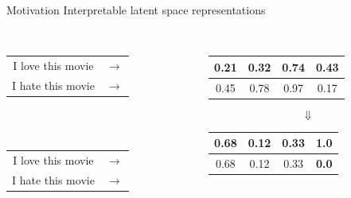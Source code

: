 \documentclass{beamer}
\begin{document}
\begin{frame}{Motivation}
  \centering
  {\LARGE Interpretable latent space representations} \\
  \vspace{1cm} \\
  \begin{columns}[T] %
    \begin{column}{.3\textwidth}
      \centering
      \begin{tabular}{ c c }
        I love this movie & $\rightarrow$ \\
        I hate this movie & $\rightarrow$ \\
      \end{tabular} \\
      \vspace{1.8cm} \\
      \begin{tabular}{ c c }
        I love this movie & $\rightarrow$ \\
        I hate this movie & $\rightarrow$ \\
      \end{tabular}
    \end{column}
    \hfill
    \begin{column}{.6\textwidth}
      \centering
      \begin{tabular}{ | c | c | c | c | }
        \hline
        0.21 & 0.32 & 0.74 & 0.43 \\
        \hline
        0.45 & 0.78 & 0.97 & 0.17 \\
        \hline
      \end{tabular}
      {\Huge$$\Downarrow$$}
      \begin{tabular}{ | c | c | c | c | }
        \hline
        0.68 & 0.12 & 0.33 & {\color{red}\textbf{1.0}} \\
        \hline
        \hline
        0.68 & 0.12 & 0.33 & {\color{red}\textbf{0.0}} \\
        \hline
      \end{tabular}
    \end{column}
  \end{columns}
\end{frame}
\end{document}
